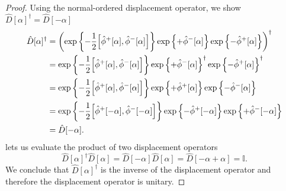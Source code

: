 \begin{proof}
	Using the normal-ordered displacement operator, we show $\hat{D}[\alpha]^\dagger=\hat{D}[-\alpha]$
	\begin{equation*}
		\begin{split}
			\hat{D}[\alpha]^\dagger
			&=
			\left(
				\exp\left\{
					-
					\frac{1}{2}
					\comm{\hat\phi^+[\alpha]}{\hat\phi^-[\alpha]}
				\right\}
				\exp\left\{
					+
					\hat\phi^-[\alpha]
				\right\}
				\exp\left\{
					-
					\hat\phi^+[\alpha]
				\right\}
			\right)^\dagger
			\\
			&=
			\exp\left\{
				-
				\frac{1}{2}
				\comm{\hat\phi^+[\alpha]}{\hat\phi^-[\alpha]}
			\right\}
			\exp\left\{
				+
				\hat\phi^-[\alpha]
			\right\}^\dagger
			\exp\left\{
				-
				\hat\phi^+[\alpha]
			\right\}^\dagger
			\\
			&=
			\exp\left\{
				-
				\frac{1}{2}
				\comm{\hat\phi^+[\alpha]}{\hat\phi^-[\alpha]}
			\right\}
			\exp\left\{
				+
				\hat\phi^+[\alpha]
			\right\}
			\exp\left\{
				-
				\hat\phi^-[\alpha]
			\right\}
			\\
			&=
			\exp\left\{
				-
				\frac{1}{2}
				\comm{\hat\phi^+[-\alpha]}{\hat\phi^-[-\alpha]}
			\right\}
			\exp\left\{
				-
				\hat\phi^+[-\alpha]
			\right\}
			\exp\left\{
				+
				\hat\phi^-[-\alpha]
			\right\}
			\\
			&=
			\hat{D}[-\alpha]
			.
		\end{split}
	\end{equation*}
	 lets us evaluate the product of two displacement operators
	\begin{equation*}
		\hat{D}[\alpha]^\dagger
		\hat{D}[\alpha]
		=
		\hat{D}[-\alpha]
		\hat{D}[\alpha]
		=
		\hat{D}[-\alpha+\alpha]
		=
		\mathbb{I}
		.
	\end{equation*}
	We conclude that $\hat{D}[\alpha]^\dagger$ is the inverse of the displacement operator and therefore the displacement operator is unitary.
\end{proof}

